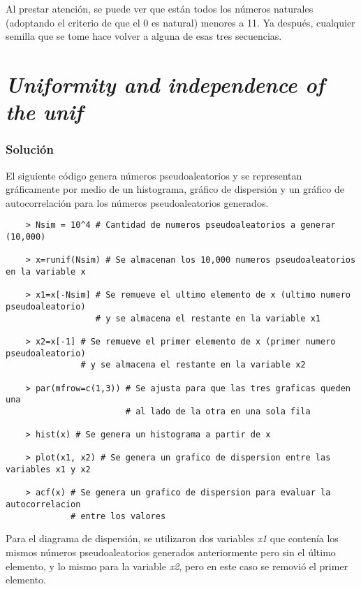 \documentclass[12pt]{article}
\begin{document}
Al prestar atención, se puede ver que están todos los números naturales (adoptando el criterio de que el 0 es natural) menores a 11. Ya después, cualquier semilla que se tome hace volver a alguna de esas tres secuencias.



\section{\textit{Uniformity and independence of the unif}}

\subsubsection{Solución}


El siguiente código genera números pseudoaleatorios y se representan gráficamente por medio de un histograma, gráfico de dispersión y un gráfico de autocorrelación para los números pseudoaleatorios generados.

\begin{lstlisting}
    > Nsim = 10^4 # Cantidad de numeros pseudoaleatorios a generar (10,000)
    
    > x=runif(Nsim) # Se almacenan los 10,000 numeros pseudoaleatorios en la variable x 
    
    > x1=x[-Nsim] # Se remueve el ultimo elemento de x (ultimo numero pseudoaleatorio)
                  # y se almacena el restante en la variable x1
                  
    > x2=x[-1] # Se remueve el primer elemento de x (primer numero pseudoaleatorio)
               # y se almacena el restante en la variable x2
               
    > par(mfrow=c(1,3)) # Se ajusta para que las tres graficas queden una 
                        # al lado de la otra en una sola fila

    > hist(x) # Se genera un histograma a partir de x

    > plot(x1, x2) # Se genera un grafico de dispersion entre las variables x1 y x2

    > acf(x) # Se genera un grafico de dispersion para evaluar la autocorrelacion 
             # entre los valores
\end{lstlisting}


Para el diagrama de dispersión, se utilizaron dos variables \textit{x1} que contenía los mismos números pseudoaleatorios generados anteriormente pero sin el último elemento, y lo mismo para la variable \textit{x2}, pero en este caso se removió el primer elemento.
\end{document}
